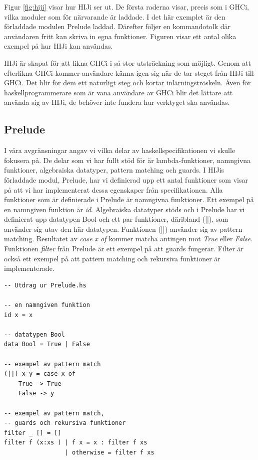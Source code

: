 Figur \ref{fig:hiji} visar hur HIJi ser ut. De första raderna visar, precis som i GHCi, vilka moduler som för närvarande är laddade. I det här exemplet är den förladdade modulen Prelude laddad. Därefter följer en kommandotolk där användaren fritt kan skriva in egna funktioner. Figuren visar ett antal olika exempel på hur HIJi kan användas. 

HIJi är skapat för att likna GHCi i så stor utsträckning som möjligt.
Genom att efterlikna GHCi kommer användare känna igen sig när de tar steget från HIJi till GHCi. Det blir för dem ett naturligt steg och kortar inlärningströskeln. Även för haskellprogrammerare som är vana användare av GHCi blir det lättare att använda sig av HIJi, de behöver inte fundera hur verktyget ska användas.

\subsection{Prelude}
I våra avgränsningar angav vi vilka delar av haskellspecifikationen vi skulle fokusera på. De delar som vi har fullt stöd för är lambda-funktioner, namngivna funktioner, algebraiska datatyper, pattern matching och guards. 
I HIJis förladdade  modul, Prelude, har vi definierad upp ett antal funktioner som visar på att vi har implementerat dessa egenskaper från specifikationen.
Alla funktioner som är definierade i Prelude är namngivna funktioner. Ett exempel på en namngiven funktion är \emph{id}. 
Algebraiska datatyper stöds och i  Prelude har vi definierat upp datatypen Bool och ett par funktioner, däribland (||), som använder sig utav den här datatypen. Funktionen (||) använder sig av pattern matching. Resultatet av \emph{case x of} kommer matcha antingen mot \emph{True} eller \emph{False}.
Funktionen \emph{filter} från Prelude är ett exempel på att guards fungerar. Filter är också ett exempel på att pattern matching och rekursiva funktioner är implementerade. 

\begin{lstlisting}
-- Utdrag ur Prelude.hs

-- en namngiven funktion
id x = x

-- datatypen Bool
data Bool = True | False

-- exempel av pattern match
(||) x y = case x of
    True -> True
    False -> y

-- exempel av pattern match, 
-- guards och rekursiva funktioner
filter _ [] = []
filter f (x:xs ) | f x = x : filter f xs
                 | otherwise = filter f xs
\end{lstlisting}

